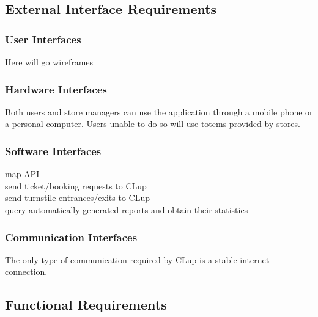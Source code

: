 
\subsection{External Interface Requirements}

\subsubsection{User Interfaces}
Here will go wireframes
\subsubsection{Hardware Interfaces}
Both users and store managers can use the application through a mobile phone or a personal computer. Users unable to do so will use totems provided by stores.
\subsubsection{Software Interfaces}
map API\\
send ticket/booking requests to CLup\\
send turnstile entrances/exits to CLup\\
query automatically generated reports and obtain their statistics\\
\subsubsection{Communication Interfaces}
The only type of communication required by CLup is a stable internet connection.
\subsection{Functional Requirements}

